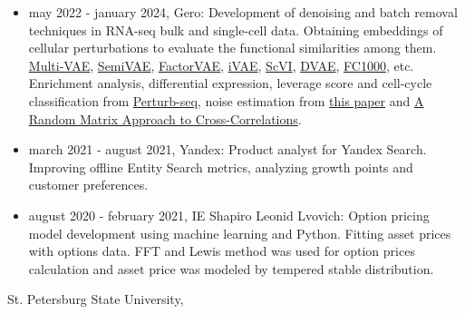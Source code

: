 \documentclass[11pt]{article}
\begin{document}
\begin{multicols}{2}
 
\begin{itemize}

\item may 2022 - january 2024, Gero: Development of denoising and batch removal techniques in RNA-seq bulk and single-cell data. Obtaining embeddings of cellular perturbations to evaluate the functional similarities among them. \href{https://openaccess.thecvf.com/content/ICCV2021/papers/Xu_Multi-VAE_Learning_Disentangled_View-Common_and_View-Peculiar_Visual_Representations_for_Multi-View_ICCV_2021_paper.pdf}{Multi-VAE}, \href{https://arxiv.org/abs/1603.02514}{SemiVAE}, \href{https://arxiv.org/abs/1802.05983}{FactorVAE}, \href{https://arxiv.org/abs/1907.04809}{iVAE}, \href{https://docs.scvi-tools.org/en/stable/api/reference/scvi.model.SCVI.html#scvi.model.SCVI}{ScVI}, \href{https://arxiv.org/abs/1509.05982}{DVAE}, \href{https://www.degruyter.com/document/doi/10.1515/sagmb-2016-0072/html}{FC1000}, etc. Enrichment analysis, differential expression, leverage score and cell-cycle classification from \href{https://pubmed.ncbi.nlm.nih.gov/35688146/}{Perturb-seq}, noise estimation from \href{https://www.biorxiv.org/content/10.1101/2022.06.23.497402v1}{this paper} and \href{https://arxiv.org/abs/cond-mat/0108023}{A Random Matrix Approach to Cross-Correlations}.

\item march 2021 - august 2021, Yandex: Product analyst for Yandex Search. Improving offline Entity Search metrics, analyzing growth points and customer preferences.

\item august 2020 - february 2021, IE Shapiro Leonid Lvovich: Option pricing model development using machine learning and Python. Fitting asset prices with options data. FFT and Lewis method was used for option prices calculation and asset price was modeled by tempered stable distribution.

\end{itemize}

\vspace{0.5em}

\columnbreak


\vspace{0.5em}

St. Petersburg State University, 


\end{multicols}
\end{document}
